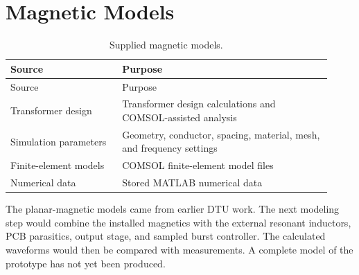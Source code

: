\section{Magnetic Models}
\begin{longtable}{@{}L{0.32\linewidth}L{0.60\linewidth}@{}}
\caption{Supplied magnetic models.}\label{tab:app-magnetics-model-files}\\
\toprule Source & Purpose\\\midrule
\endfirsthead
\toprule Source & Purpose\\\midrule
\endhead
Transformer design & Transformer design calculations and COMSOL-assisted analysis\\
Simulation parameters & Geometry, conductor, spacing, material, mesh, and frequency settings\\
Finite-element models & COMSOL finite-element model files\\
Numerical data & Stored MATLAB numerical data\\
\bottomrule
\end{longtable}
The planar-magnetic models came from earlier DTU work. The next modeling step would combine the installed magnetics with the external resonant inductors, PCB parasitics, output stage, and sampled burst controller. The calculated waveforms would then be compared with measurements. A complete model of the prototype has not yet been produced.
